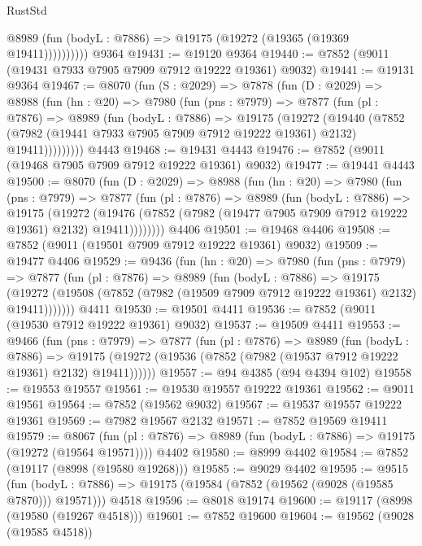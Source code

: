 \begin{lexlean}{RustStd}
\begin{coremodule}
              @8989 (fun (bodyL : @7886) => @19175 (@19272 (@19365 (@19369 @19411))))))))))
    @9364
@19431 := @19120 @9364
@19440 := @7852 (@9011 (@19431 @7933 @7905 @7909 @7912 @19222 @19361) @9032)
@19441 := @19131 @9364
@19467 := @8070
    (fun (S : @2029) =>
    @7878
      (fun (D : @2029) =>
      @8988
        (fun (hn : @20) =>
        @7980
          (fun (pns : @7979) =>
          @7877
            (fun (pl : @7876) =>
            @8989
              (fun (bodyL : @7886) =>
              @19175
                (@19272
                  (@19440
                    (@7852
                      (@7982 (@19441 @7933 @7905 @7909 @7912 @19222 @19361) @2132)
                      @19411)))))))))
    @4443
@19468 := @19431 @4443
@19476 := @7852 (@9011 (@19468 @7905 @7909 @7912 @19222 @19361) @9032)
@19477 := @19441 @4443
@19500 := @8070
    (fun (D : @2029) =>
    @8988
      (fun (hn : @20) =>
      @7980
        (fun (pns : @7979) =>
        @7877
          (fun (pl : @7876) =>
          @8989
            (fun (bodyL : @7886) =>
            @19175
              (@19272
                (@19476 (@7852 (@7982 (@19477 @7905 @7909 @7912 @19222 @19361) @2132) @19411))))))))
    @4406
@19501 := @19468 @4406
@19508 := @7852 (@9011 (@19501 @7909 @7912 @19222 @19361) @9032)
@19509 := @19477 @4406
@19529 := @9436
    (fun (hn : @20) =>
    @7980
      (fun (pns : @7979) =>
      @7877
        (fun (pl : @7876) =>
        @8989
          (fun (bodyL : @7886) =>
          @19175
            (@19272 (@19508 (@7852 (@7982 (@19509 @7909 @7912 @19222 @19361) @2132) @19411)))))))
    @4411
@19530 := @19501 @4411
@19536 := @7852 (@9011 (@19530 @7912 @19222 @19361) @9032)
@19537 := @19509 @4411
@19553 := @9466
    (fun (pns : @7979) =>
    @7877
      (fun (pl : @7876) =>
      @8989
        (fun (bodyL : @7886) =>
        @19175 (@19272 (@19536 (@7852 (@7982 (@19537 @7912 @19222 @19361) @2132) @19411))))))
@19557 := @94 @4385 (@94 @4394 @102)
@19558 := @19553 @19557
@19561 := @19530 @19557 @19222 @19361
@19562 := @9011 @19561
@19564 := @7852 (@19562 @9032)
@19567 := @19537 @19557 @19222 @19361
@19569 := @7982 @19567 @2132
@19571 := @7852 @19569 @19411
@19579 := @8067
    (fun (pl : @7876) => @8989 (fun (bodyL : @7886) => @19175 (@19272 (@19564 @19571))))
    @4402
@19580 := @8999 @4402
@19584 := @7852 (@19117 (@8998 (@19580 @19268)))
@19585 := @9029 @4402
@19595 := @9515
    (fun (bodyL : @7886) => @19175 (@19584 (@7852 (@19562 (@9028 (@19585 @7870))) @19571)))
    @4518
@19596 := @8018 @19174
@19600 := @19117 (@8998 (@19580 (@19267 @4518)))
@19601 := @7852 @19600
@19604 := @19562 (@9028 (@19585 @4518))

\end{coremodule}
\end{lexlean}
